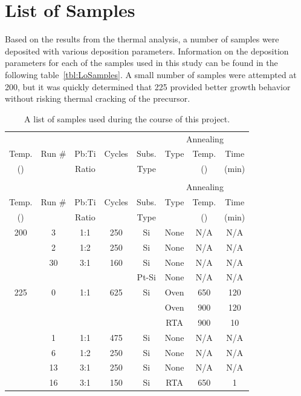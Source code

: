 \section{List of Samples}
\label{chap:Results-Samples}

Based on the results from the thermal analysis, a number of samples were deposited with various deposition parameters. Information on the deposition parameters for each of the samples used in this study can be found in the following table~\vref{tbl:LoSamples}. A small number of samples were attempted at 200\degC{}, but it was quickly determined that 225\degC{} provided better growth behavior without risking thermal cracking of the precursor. 

{\small
\begin{longtable}{cccccccc}
	\caption[List of Samples]{A list of samples produced during the course of this project.%
	\label{tbl:LoSamples}}\\
	\toprule
	&&&&&\multicolumn{3}{c}{Annealing}\\ \cmidrule{6-8}
	Temp.		&Run \#	&Pb:Ti	 	&Cycles 	&Subs. 	&Type	&Temp. 		&Time\\ 
	(\degC{})		&		&Ratio		&		&Type	&		&(\degC{})	&(min)\\ \midrule%
	\endfirsthead
	\caption[]{A list of samples used during the course of this project.}\\
	\toprule
	&&&&&\multicolumn{3}{c}{Annealing}\\ \cmidrule{6-8}
	Temp.		&Run \#	&Pb:Ti	 	&Cycles 	&Subs. 	&Type	&Temp. 		&Time \\ 
	(\degC{})		&		&Ratio		&		&Type	&		&(\degC{})	&(min) \\ \midrule%
	\endhead
	200	&3		&1:1		&250	&Si		&None	&N/A		&N/A		\\
		&2		&1:2		&250	&Si		&None	&N/A		&N/A		\\
		&30		&3:1		&160	&Si		&None	&N/A		&N/A		\\
		&		&		&		&Pt-Si	&None	&N/A		&N/A		\\ \midrule
	225	&0		&1:1		&625	&Si		&Oven	&650	&120	\\
		&		&		&		&		&Oven	&900	&120	\\
		&		&		&		&		&RTA	&900	&10		\\
		&1		&1:1		&475	&Si		&None	&N/A		&N/A		\\
		&6		&1:2		&250	&Si		&None 	&N/A		&N/A		\\
		&13		&3:1		&250	&Si		&None 	&N/A		&N/A		\\
		&16		&3:1		&150	&Si		&RTA	&650	&1		\\

\end{longtable}}
